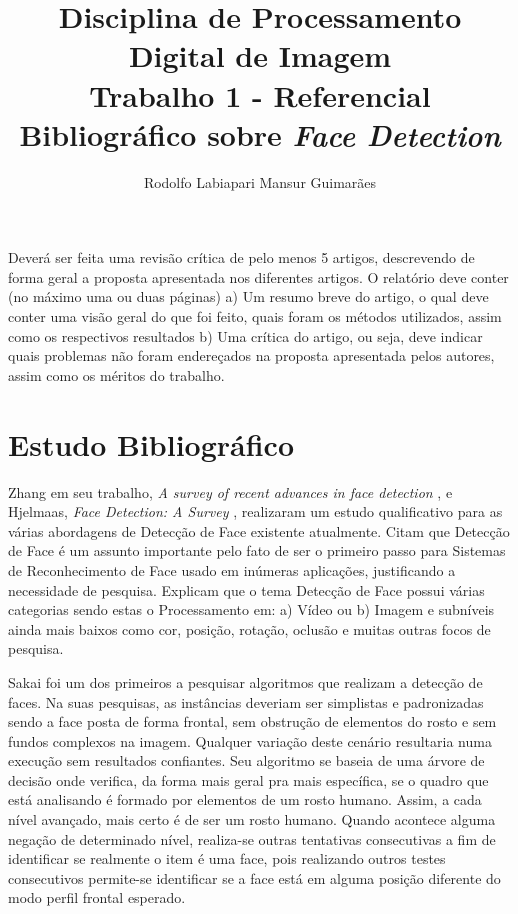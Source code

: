 \documentclass[12pt]{article}
\title{Disciplina de Processamento Digital de Imagem \\ Trabalho 1 - Referencial Bibliográfico sobre \textit{Face Detection}}
\author{Rodolfo Labiapari Mansur Guimarães}
\begin{document}
 

\maketitle

\begin{resumo} 
  Deverá ser feita uma revisão crítica de pelo menos 5 artigos, descrevendo de forma geral a proposta apresentada nos diferentes artigos. 
  O relatório deve conter (no máximo uma ou duas páginas)
  a) Um resumo breve do artigo, o qual deve conter uma visão geral do que foi feito, quais foram os métodos utilizados, assim como os respectivos resultados
  b) Uma crítica do artigo, ou seja, deve indicar quais problemas não foram endereçados na proposta apresentada pelos autores, assim como os méritos do trabalho.
\end{resumo}

\section{Estudo Bibliográfico}

Zhang em seu trabalho, \textit{A survey of recent advances in face detection} \cite{zhang2010survey}, e Hjelmaas, \textit{Face Detection: A Survey} \cite{hjelmaas2001face}, realizaram um estudo qualificativo para as várias abordagens de Detecção de Face existente atualmente. Citam que Detecção de Face é um assunto importante pelo fato de ser o primeiro passo para Sistemas de Reconhecimento de Face usado em inúmeras aplicações, justificando a necessidade de pesquisa. Explicam que o tema Detecção de Face possui várias categorias sendo estas o Processamento em: a) Vídeo ou b) Imagem e subníveis ainda mais baixos como cor, posição, rotação, oclusão e muitas outras focos de pesquisa. 

Sakai \cite{sakai1972computer} foi um dos primeiros a pesquisar algoritmos que realizam a detecção de faces. Na suas pesquisas, as instâncias deveriam ser simplistas e padronizadas sendo a face posta de forma frontal, sem obstrução de elementos do rosto e sem fundos complexos na imagem. Qualquer variação deste cenário resultaria numa execução sem resultados confiantes. Seu algoritmo se baseia de uma árvore de decisão onde verifica, da forma mais geral pra mais específica, se o quadro que está analisando é formado por elementos de um rosto humano. Assim, a cada nível avançado, mais certo é de ser um rosto humano. Quando acontece alguma negação de determinado nível, realiza-se outras tentativas consecutivas a fim de identificar se realmente o item é uma face, pois realizando outros testes consecutivos permite-se identificar se a face está em alguma posição diferente do modo perfil frontal esperado.
\end{document}
